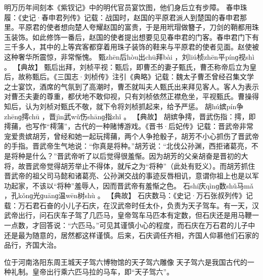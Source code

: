 \documentclass[12pt,UTF8]{ctexbook}
\begin{document}
明万历年间刻本《紫钗记》中的明代官员宴饮图，他们身后立有步障。
春申珠履：《史记·春申君列传》记载：战国时，赵国的平原君派人到楚国的春申君那里。平原君的使者想向楚人夸耀赵国的富贵，于是用玳瑁做簪子，刀剑的鞘都用珠玉装饰。如此修饰一番后，赵国的使者提出想要见见春申君的门客。春申君门下有三千多人，其中的上等宾客都穿着用珠子装饰的鞋来与平原君的使者见面。赵使被这种奢华所震惊，非常惭愧。
甄zhēn后hòu出chū拜bài
，刘liú桢zhēn平pínɡ视shì
。
【典故】
甄后出拜，刘桢平视：甄后，即曹丕的妻子甄氏，曹丕称帝后立为皇后，故称甄后。《三国志·刘桢传》注引《典略》记载：魏太子曹丕曾经召集文学之士宴饮，酒席的气氛到了高潮时，曹丕就叫夫人甄氏出来拜见客人。客人为表示对曹丕夫妻的尊重，都伏地不敢仰视，只有刘桢依然正襟危坐，平视甄氏。曹操得知后，认为刘桢对甄氏不敬，就下令将刘桢抓起来，给予严惩。
胡hú嫔pín争zhēnɡ摴chū
，晋jìn武wǔ伤shānɡ指zhǐ
。
【典故】
胡嫔争摴，晋武伤指：摴，即摴蒱，也写作“樗蒲”，古代的一种赌博游戏。《晋书·后妃传》记载：晋武帝非常宠爱贵嫔胡芳，曾经和她一起玩摴蒱，两个人争抢骰子，胡芳不小心抓伤了晋武帝的手指。晋武帝生气地说：“你真是将种。”胡芳说：“北伐公孙渊，西拒诸葛亮，不是将种是什么？”晋武帝听了以后觉得很羞惭。因为胡芳的父亲胡奋是晋初的大将，故晋武帝觉得胡芳举止不得体，就斥之为“将种”（此处有贬义）。而胡芳抓住晋武帝的祖父司马懿和诸葛亮、公孙渊交战的事迹反唇相讥，意谓你祖上也是以军功起家，不该以“将种”羞辱人，因而晋武帝有羞惭之色。
石shí庆qìnɡ数shǔ马mǎ
，孔kǒnɡ光ɡuānɡ温wēn树shù
。
【典故】
石庆数马：《史记·万石张叔列传》记载：万石君石奋的小儿子石庆，在汉武帝时任太仆，负责为天子驾车。有一天，汉武帝出行，问石庆车子驾了几匹马，皇帝驾车马匹本有定数，但石庆还是用马鞭一一点数，才回答说：“六匹马。”可见其谨慎小心的程度，而石庆在万石君的儿子中还是最为随意的，居然都这样谨慎。后来，石庆调任齐相，齐国人仰慕他们石家的品行，齐国大治。

位于河南洛阳东周王城天子驾六博物馆的天子驾六雕像
天子驾六是我国古代的一种礼制。皇帝出行乘六匹马拉的马车，即“天子驾六”。
\end{document}
